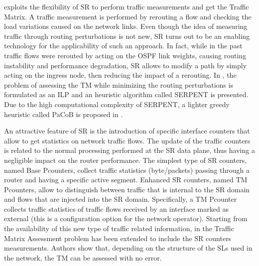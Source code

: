 \cite{polverini2018routing} exploits the flexibility of SR to perform traffic measurements and get the Traffic Matrix.
A traffic measurement is performed by rerouting a flow and checking the load variations caused on the network links.
Even though the idea of measuring traffic through routing perturbations is not new, SR turns out to be an enabling technology for the applicability of such an approach.
In fact, while in the past traffic flows were rerouted by acting on the OSPF link weights, causing routing instability and performance degradation, SR allows to modify a path by simply acting on the ingress node, then reducing the impact of a rerouting.
In \cite{polverini2018routing}, the problem of assessing the TM while minimizing the routing perturbations is formulated as an ILP and an heuristic algorithm called SERPENT is presented.
Due to the high computational complexity of SERPENT, a lighter greedy heuristic called PaCoB is proposed in \cite{cianfrani2018heuristic}.

An attractive feature of SR is the introduction of specific interface counters that allow to get statistics on network traffic flows.
The update of the traffic counters is related to the normal processing performed at the SR data plane, thus having a negligible impact on the router performance.
The simplest type of SR counters, named Base Pcounters, collect traffic statistics (byte/packets) passing through a router and having a specific active segment.
Enhanced SR counters, named TM Pcounters, allow to distinguish between traffic that is internal to the SR domain and flows that are injected into the SR domain.
Specifically, a TM Pcounter collects traffic statistics of traffic flows received by an interface marked as external (this is a configuration option for the network operator).
Starting from the availability of this new type of traffic related information, in \cite{polveriniNoF2018} the Traffic Matrix Assessment problem has been extended to include the SR counters measurements.
Authors show that, depending on the structure of the SLs used in the network, the TM can be assessed with no error.

